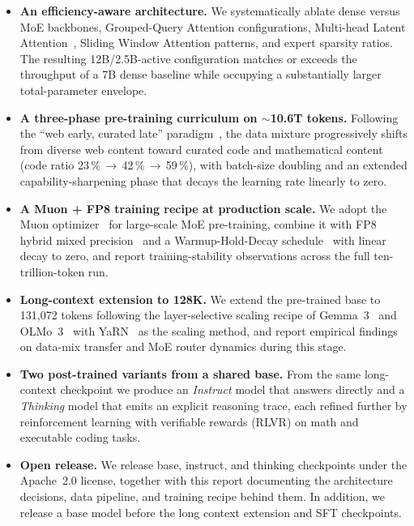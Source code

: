 \documentclass[11pt,a4paper]{article}
\begin{document}
\begin{itemize}
  \item \textbf{An efficiency-aware architecture.} We systematically ablate
    dense versus MoE backbones, Grouped-Query Attention configurations,
    Multi-head Latent Attention~\cite{deepseekai2024deepseekv2}, Sliding
    Window Attention patterns, and expert sparsity ratios. The resulting 12B/2.5B-active configuration matches or exceeds the throughput of a 7B dense baseline while occupying a substantially larger total-parameter envelope.
  \item \textbf{A three-phase pre-training curriculum on ${\sim}$10.6T tokens.}
    Following the ``web early, curated late''
    paradigm~\cite{grattafiori2024llama3}, the data mixture progressively
    shifts from diverse web content toward curated code and mathematical
    content (code ratio 23\,\%\,$\to$\,42\,\%\,$\to$\,59\,\%), with batch-size
    doubling and an extended capability-sharpening phase that decays the
    learning rate linearly to zero.
  \item \textbf{A Muon + FP8 training recipe at production scale.} We adopt
    the Muon optimizer~\cite{jordan2024muon,liu2025muon} for large-scale MoE
    pre-training, combine it with FP8 hybrid mixed
    precision~\cite{micikevicius2022fp8} and a Warmup-Hold-Decay
    schedule~\cite{hu2024minicpm,hagele2024scaling} with linear decay to
    zero, and report training-stability observations across the full
    ten-trillion-token run.
  \item \textbf{Long-context extension to 128K.} We extend the pre-trained
    base to 131{,}072 tokens following the layer-selective scaling recipe
    of Gemma~3~\cite{team2025gemma3} and OLMo~3~\cite{olmo3} with
    YaRN~\cite{peng2024yarn} as the scaling method, and report empirical
    findings on data-mix transfer and MoE router dynamics during this
    stage.
  \item \textbf{Two post-trained variants from a shared base.} From the same
    long-context checkpoint we produce an \emph{Instruct} model that answers
    directly and a \emph{Thinking} model that emits an explicit reasoning
    trace, each refined further by reinforcement learning with verifiable
    rewards (RLVR) on math and executable coding tasks.
  \item \textbf{Open release.} We release base, instruct, and thinking
    checkpoints under the Apache~2.0 license, together with this report
    documenting the architecture decisions, data pipeline, and training
    recipe behind them. In addition, we release a base model before the long context extension and SFT checkpoints.
\end{itemize}
\end{document}
